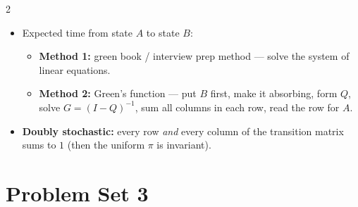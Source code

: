 \documentclass[8pt,letterpaper]{extarticle}
\begin{document}
\begin{multicols}{2}
\begin{itemize}
  \item Expected time from state $A$ to state $B$:
    \begin{itemize}
      \item \textbf{Method 1:} green book / interview prep method --- solve the system of linear equations.
      \item \textbf{Method 2:} Green's function --- put $B$ first, make it absorbing, form $Q$, solve $G=(I-Q)^{-1}$, sum all columns in each row, read the row for $A$.
    \end{itemize}
  \item \textbf{Doubly stochastic:} every row \emph{and} every column of the transition matrix sums to $1$ (then the uniform $\pi$ is invariant).
\end{itemize}

\section{Problem Set 3}

\end{multicols}
\end{document}
